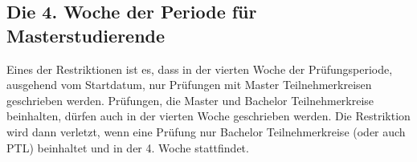 \subsection{Die 4. Woche der Periode für Masterstudierende}
Eines der Restriktionen ist es, dass in der vierten Woche der Prüfungsperiode,
ausgehend vom Startdatum, nur Prüfungen mit Master Teilnehmerkreisen geschrieben werden.
Prüfungen, die Master und Bachelor Teilnehmerkreise beinhalten, dürfen auch in der vierten Woche
geschrieben werden.
Die Restriktion wird dann verletzt, wenn eine Prüfung nur Bachelor Teilnehmerkreise (oder auch PTL) beinhaltet und in der 4. Woche stattfindet.

